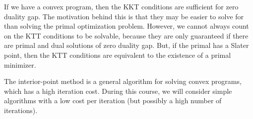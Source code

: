 If we have a convex program, then the KKT conditions are sufficient for zero duality gap. The
motivation behind this is that they may be easier to solve for than solving the primal optimization
problem. However, we cannot always count on the KTT conditions to be solvable, because they are
only guaranteed if there are primal and dual solutions of zero duality gap. But, if the primal has
a Slater point, then the KTT conditions are equivalent to the existence of a primal minimizer.

The interior-point method is a general algorithm for solving convex programs, which has a high
iteration cost. During this course, we will consider simple algorithms with a low cost per
iteration (but possibly a high number of iterations).
